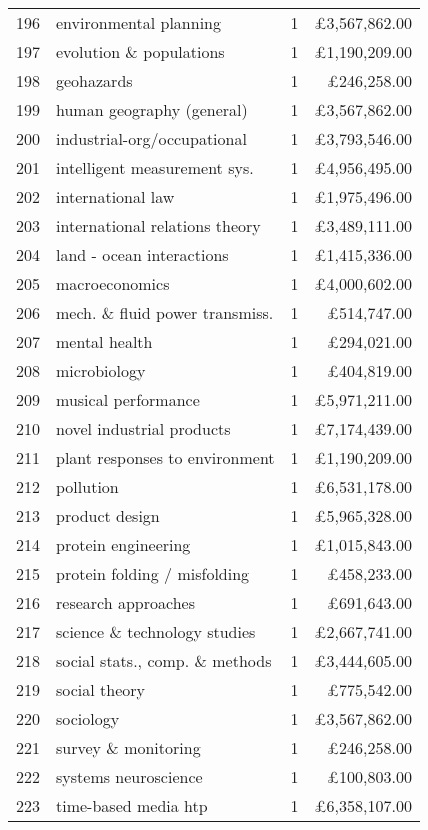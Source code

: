 \begin{spacing}{0.9}
\begin{longtable}[c]{r|>{\raggedleft\arraybackslash}m{6.5cm}|>{\raggedleft\arraybackslash}m{1.9cm}|r}
{196} & {environmental planning} & {1} & {\pounds3,567,862.00}\\
{197} & {evolution \& populations} & {1} & {\pounds1,190,209.00}\\
{198} & {geohazards} & {1} & {\pounds246,258.00}\\
{199} & {human geography (general)} & {1} & {\pounds3,567,862.00}\\
{200} & {industrial-org/occupational} & {1} & {\pounds3,793,546.00}\\
{201} & {intelligent measurement sys.} & {1} & {\pounds4,956,495.00}\\
{202} & {international law} & {1} & {\pounds1,975,496.00}\\
{203} & {international relations theory} & {1} & {\pounds3,489,111.00}\\
{204} & {land - ocean interactions} & {1} & {\pounds1,415,336.00}\\
{205} & {macroeconomics} & {1} & {\pounds4,000,602.00}\\
{206} & {mech. \& fluid power transmiss.} & {1} & {\pounds514,747.00}\\
{207} & {mental health} & {1} & {\pounds294,021.00}\\
{208} & {microbiology} & {1} & {\pounds404,819.00}\\
{209} & {musical performance} & {1} & {\pounds5,971,211.00}\\
{210} & {novel industrial products} & {1} & {\pounds7,174,439.00}\\
{211} & {plant responses to environment} & {1} & {\pounds1,190,209.00}\\
{212} & {pollution} & {1} & {\pounds6,531,178.00}\\
{213} & {product design} & {1} & {\pounds5,965,328.00}\\
{214} & {protein engineering} & {1} & {\pounds1,015,843.00}\\
{215} & {protein folding / misfolding} & {1} & {\pounds458,233.00}\\
{216} & {research approaches} & {1} & {\pounds691,643.00}\\
{217} & {science \& technology studies} & {1} & {\pounds2,667,741.00}\\
{218} & {social stats., comp. \& methods} & {1} & {\pounds3,444,605.00}\\
{219} & {social theory} & {1} & {\pounds775,542.00}\\
{220} & {sociology} & {1} & {\pounds3,567,862.00}\\
{221} & {survey \& monitoring} & {1} & {\pounds246,258.00}\\
{222} & {systems neuroscience} & {1} & {\pounds100,803.00}\\
{223} & {time-based media htp} & {1} & {\pounds6,358,107.00}
\end{longtable}
\end{spacing}


